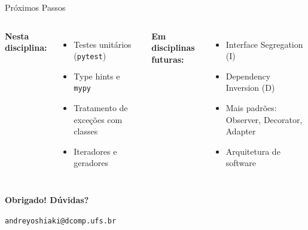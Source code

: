 \documentclass[aspectratio=169]{beamer}
\begin{document}
\begin{frame}{Próximos Passos}
\begin{columns}[T]
\textbf{Nesta disciplina:}
\begin{itemize}
  \item Testes unitários (\texttt{pytest})
  \item Type hints e \texttt{mypy}
  \item Tratamento de exceções com classes
  \item Iteradores e geradores
\end{itemize}

\textbf{Em disciplinas futuras:}
\begin{itemize}
  \item Interface Segregation (I)
  \item Dependency Inversion (D)
  \item Mais padrões: Observer, Decorator, Adapter
  \item Arquitetura de software
\end{itemize}
\end{columns}

\vspace{0.5cm}
\begin{center}
\Large \textbf{Obrigado! Dúvidas?}

\normalsize \texttt{andreyoshiaki@dcomp.ufs.br}
\end{center}
\end{frame}
\end{document}
